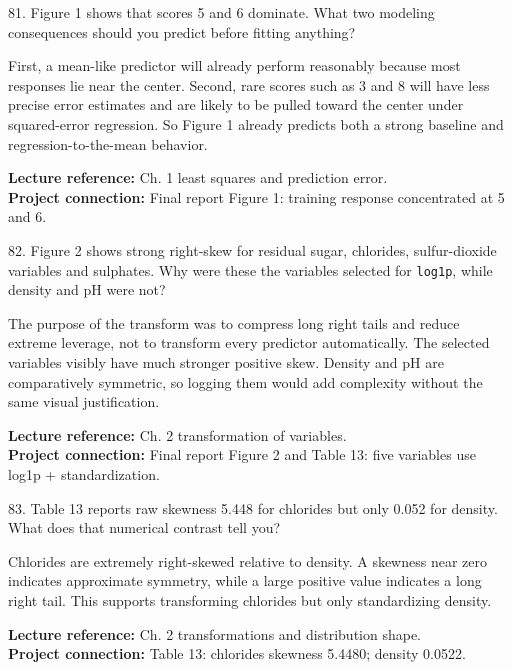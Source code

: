\documentclass[10.5pt,a4paper]{article}
\newcommand{\chapref}[1]{\textbf{Lecture reference:} #1}
\newcommand{\projectref}[1]{\textbf{Project connection:} #1}
\begin{document}
\begin{qbox}{81. Figure 1 shows that scores 5 and 6 dominate. What two modeling consequences should you predict before fitting anything?}
\end{qbox}
\begin{answerbox}
First, a mean-like predictor will already perform reasonably because most responses lie near the center. Second, rare scores such as 3 and 8 will have less precise error estimates and are likely to be pulled toward the center under squared-error regression. So Figure 1 already predicts both a strong baseline and regression-to-the-mean behavior.
\end{answerbox}
\begin{refbox}\chapref{Ch. 1 least squares and prediction error.}\\\projectref{Final report Figure 1: training response concentrated at 5 and 6.}\end{refbox}

\begin{qbox}{82. Figure 2 shows strong right-skew for residual sugar, chlorides, sulfur-dioxide variables and sulphates. Why were these the variables selected for \texttt{log1p}, while density and pH were not?}
\end{qbox}
\begin{answerbox}
The purpose of the transform was to compress long right tails and reduce extreme leverage, not to transform every predictor automatically. The selected variables visibly have much stronger positive skew. Density and pH are comparatively symmetric, so logging them would add complexity without the same visual justification.
\end{answerbox}
\begin{refbox}\chapref{Ch. 2 transformation of variables.}\\\projectref{Final report Figure 2 and Table 13: five variables use log1p + standardization.}\end{refbox}

\begin{qbox}{83. Table 13 reports raw skewness 5.448 for chlorides but only 0.052 for density. What does that numerical contrast tell you?}
\end{qbox}
\begin{answerbox}
Chlorides are extremely right-skewed relative to density. A skewness near zero indicates approximate symmetry, while a large positive value indicates a long right tail. This supports transforming chlorides but only standardizing density.
\end{answerbox}
\begin{refbox}\chapref{Ch. 2 transformations and distribution shape.}\\\projectref{Table 13: chlorides skewness 5.4480; density 0.0522.}\end{refbox}
\end{document}
